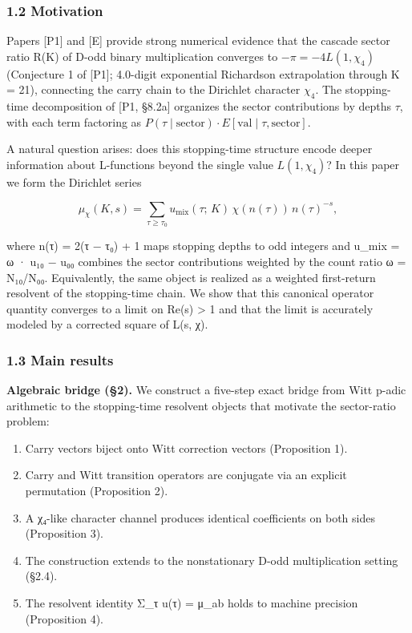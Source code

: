 \documentclass[
  11pt,
]{article}
\providecommand{\tightlist}{%
  \setlength{\itemsep}{0pt}\setlength{\parskip}{0pt}}
\begin{document}
\subsubsection{1.2 Motivation}\label{motivation}

Papers {[}P1{]} and {[}E{]} provide strong numerical evidence that the cascade
sector ratio R(K) of D-odd binary multiplication converges to
\(-\pi = -4L(1, \chi_4)\) (Conjecture 1 of {[}P1{]}; 4.0-digit exponential
Richardson extrapolation through K = 21), connecting the carry chain to the
Dirichlet character \(\chi_4\). The stopping-time decomposition of {[}P1,
§8.2a{]} organizes the sector contributions by depths \(\tau\), with each term
factoring as
\(P(\tau \mid \text{sector}) \cdot E[\text{val} \mid \tau, \text{sector}]\).

A natural question arises: does this stopping-time structure encode deeper
information about L-functions beyond the single value \(L(1, \chi_4)\)? In this
paper we form the Dirichlet series

\[\mu_\chi(K,s) = \sum_{\tau \geq \tau_0} u_{\text{mix}}(\tau;\, K)\, \chi(n(\tau))\, n(\tau)^{-s},\]

where n(τ) = 2(τ − τ₀) + 1 maps stopping depths to odd integers and u\_mix = ω ·
u₁₀ − u₀₀ combines the sector contributions weighted by the count ratio ω =
N₁₀/N₀₀. Equivalently, the same object is realized as a weighted first-return
resolvent of the stopping-time chain. We show that this canonical operator
quantity converges to a limit on Re(s) \textgreater{} 1 and that the limit is
accurately modeled by a corrected square of L(s, χ).

\subsubsection{1.3 Main results}\label{main-results}

\textbf{Algebraic bridge (§2).} We construct a five-step exact bridge from Witt
p-adic arithmetic to the stopping-time resolvent objects that motivate the
sector-ratio problem:

\begin{enumerate}
\def\labelenumi{\arabic{enumi}.}
\tightlist
\item
  Carry vectors biject onto Witt correction vectors (Proposition 1).
\item
  Carry and Witt transition operators are conjugate via an explicit permutation
  (Proposition 2).
\item
  A χ₄-like character channel produces identical coefficients on both sides
  (Proposition 3).
\item
  The construction extends to the nonstationary D-odd multiplication setting
  (§2.4).
\item
  The resolvent identity Σ\_τ u(τ) = μ\_ab holds to machine precision
  (Proposition 4).
\end{enumerate}
\end{document}
